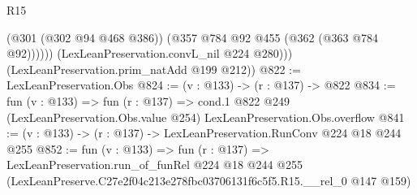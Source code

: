 \begin{lexlean}{R15}
\begin{coremodule}
                (@301 (@302 @94 @468 @386))
                (@357 @784 @92 @455 (@362 (@363 @784 @92))))))
          (LexLeanPreservation.convL_nil @224 @280)))
      (LexLeanPreservation.prim_natAdd @199 @212))
@822 := LexLeanPreservation.Obs
@824 := (v : @133) -> (r : @137) -> @822
@834 := fun (v : @133) =>
  fun (r : @137) =>
  cond.{1} @822 @249 (LexLeanPreservation.Obs.value @254) LexLeanPreservation.Obs.overflow
@841 := (v : @133) -> (r : @137) -> LexLeanPreservation.RunConv @224 @18 @244 @255
@852 := fun (v : @133) =>
  fun (r : @137) =>
  LexLeanPreservation.run_of_funRel
    @224
    @18
    @244
    @255
    (LexLeanPreserve.C27e2f04c213e278fbc03706131f6c5f5.R15.__rel_0 @147 @159)
\end{coremodule}
\end{lexlean}
